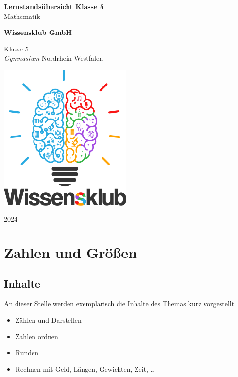 \documentclass{article}
\begin{document}
\begin{titlepage}
    \begin{center}
        \vspace*{1cm}
            
        \Huge
        \textbf{Lernstandsübersicht Klasse 5}\\            
        \vspace{0.5cm}
        \LARGE
        Mathematik
            
        \vspace{1.5cm}
            
        \textbf{Wissensklub GmbH}
            
        \vfill
            
        Klasse 5\\
        \textit{Gymnasium} Nordrhein-Westfalen
            
        \vspace{0.8cm}
            
        \includegraphics[width=0.5\textwidth]{Wissensklub-Logo.png}
            
        \Large
        2024          
    \end{center}
\end{titlepage}
\section{Zahlen und Größen}
\subsection{Inhalte}
An dieser Stelle werden exemplarisch die Inhalte des Themas kurz vorgestellt
\begin{itemize}
    \item Zählen und Darstellen
    \item Zahlen ordnen
    \item Runden
    \item Rechnen mit Geld, Längen, Gewichten, Zeit, \ldots
\end{itemize}
\end{document}
